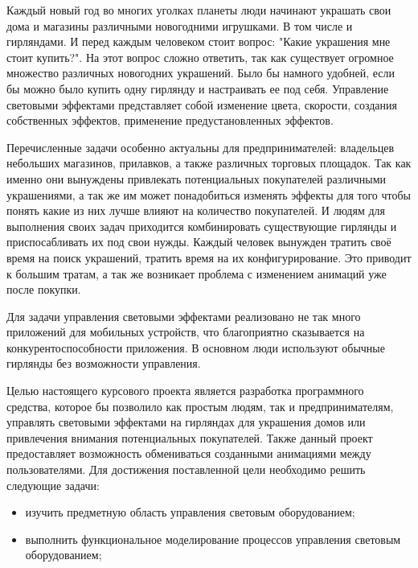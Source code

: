 \label{sec:introduction}

Каждый новый год во многих уголках планеты люди начинают украшать свои дома и магазины различными новогодними игрушками. В том числе и гирляндами. И перед каждым человеком стоит вопрос: "Какие украшения мне стоит купить?". На этот вопрос сложно ответить, так как существует огромное множество различных новогодних украшений. Было бы намного удобней, если бы можно было купить одну гирлянду и настраивать ее под себя. Управление световыми эффектами представляет собой изменение цвета, скорости, создания собственных эффектов, применение предустановленных эффектов.

Перечисленные задачи особенно актуальны для предпринимателей: владельцев небольших магазинов, прилавков, а также различных торговых площадок. Так как именно они вынуждены привлекать потенциальных покупателей различными украшениями, а так же им может понадобиться изменять эффекты для того чтобы понять какие из них лучше влияют на количество покупателей. И людям для выполнения своих задач приходится комбинировать существующие гирлянды и приспосабливать их под свои нужды. Каждый человек вынужден тратить своё время на поиск украшений, тратить время на их конфигурирование. Это приводит к большим тратам, а так же возникает проблема с изменением анимаций уже после покупки.

Для задачи управления световыми эффектами реализовано не так много приложений для мобильных устройств, что благоприятно сказывается на конкурентоспособности приложения. В основном люди используют обычные гирлянды без возможности управления.

Целью настоящего курсового проекта является разработка программного средства, которое бы позволило как простым людям, так и предпринимателям, управлять световыми эффектами на гирляндах для украшения домов или привлечения внимания потенциальных покупателей. Также данный проект предоставляет возможность обмениваться созданными анимациями между пользователями. Для достижения поставленной цели необходимо решить следующие задачи:
\begin{itemize}
\item изучить предметную область управления световым оборудованием;
\item выполнить функциональное моделирование процессов управления световым оборудованием;
\end{itemize}